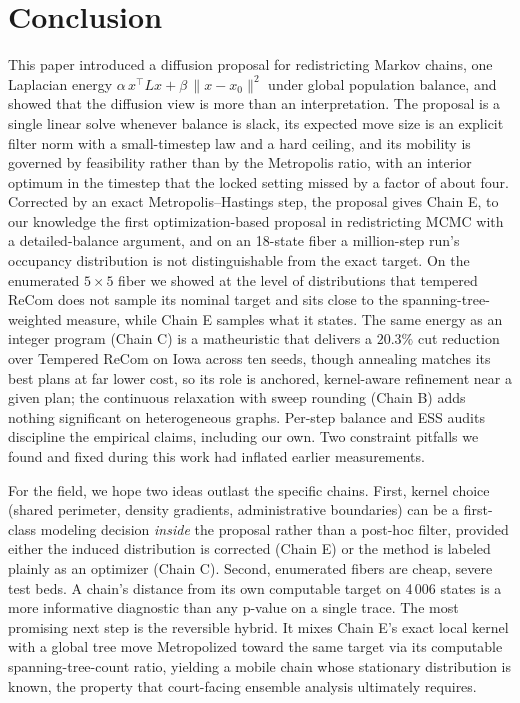 \documentclass[11pt]{article}
\begin{document}
\section{Conclusion}\label{sec:conclusion}

This paper introduced a diffusion proposal for redistricting Markov
chains, one Laplacian energy
$\alpha\,x^\top L x + \beta\,\|x - x_0\|^2$ under global population
balance, and showed that the diffusion view is more than an
interpretation. The proposal is a single linear solve whenever
balance is slack, its expected move size is an explicit filter norm
with a small-timestep law and a hard ceiling, and its mobility is
governed by feasibility rather than by the Metropolis ratio, with an
interior optimum in the timestep that the locked setting missed by a
factor of about four. Corrected by an exact Metropolis--Hastings
step, the proposal gives Chain E, to our knowledge the first
optimization-based proposal in redistricting MCMC with a
detailed-balance argument, and on an 18-state fiber a million-step
run's occupancy distribution is not distinguishable from the exact
target. On the enumerated $5 \times 5$ fiber we showed at the level
of distributions that tempered ReCom does not sample its nominal
target and sits close to the spanning-tree-weighted measure, while
Chain E samples what it states. The same energy as an integer program
(Chain C) is a matheuristic that delivers a $20.3\%$ cut reduction
over Tempered ReCom on Iowa across ten seeds, though annealing
matches its best plans at far lower cost, so its role is anchored,
kernel-aware refinement near a given plan; the continuous relaxation
with sweep rounding (Chain B) adds nothing significant on
heterogeneous graphs. Per-step balance and ESS audits discipline the
empirical claims, including our own. Two constraint pitfalls we found
and fixed during this work had inflated earlier measurements.

For the field, we hope two ideas outlast the specific chains. First,
kernel choice (shared perimeter, density gradients, administrative
boundaries) can be a first-class modeling decision \emph{inside}
the proposal rather than a post-hoc filter, provided either the induced
distribution is corrected (Chain E) or the method is labeled plainly
as an optimizer (Chain C). Second, enumerated fibers are cheap,
severe test beds. A chain's distance from its own computable target
on 4\,006 states is a more informative diagnostic than any p-value on
a single trace. The most promising next step is the reversible
hybrid. It mixes Chain E's exact local kernel with a global tree move
Metropolized toward the same target via its computable
spanning-tree-count ratio, yielding a mobile chain whose stationary
distribution is known, the property that court-facing ensemble
analysis ultimately requires.
\end{document}
